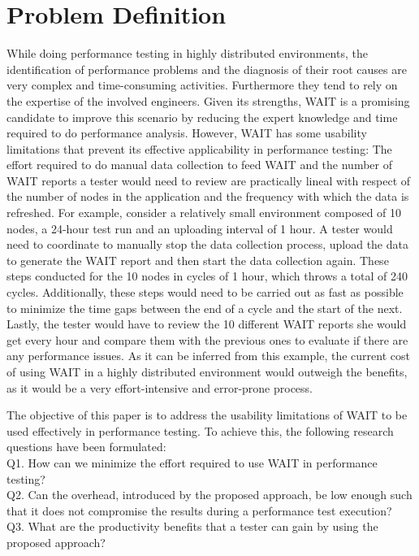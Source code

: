 \documentclass[runningheads,a4paper]{llncs}
\begin{document}
\vspace{-5pt}
\section{Problem Definition}
\vspace{-5pt}
While doing performance testing in highly distributed environments, the
identification of performance problems and the diagnosis of their root causes
are very complex and time-consuming activities. Furthermore they tend to rely
on the expertise of the involved engineers. Given its strengths, WAIT is a
promising candidate to improve this scenario by reducing the expert knowledge and time
required to do performance analysis. However, WAIT has some usability
limitations that prevent its effective applicability in performance testing: The
effort required to do manual data collection to feed WAIT and the number of WAIT
reports a tester would need to review are practically lineal with respect of the
number of nodes in the application and the frequency with which the data is
refreshed. For example, consider a relatively small environment composed of 10
nodes, a 24-hour test run and an uploading interval of 1 hour. A tester would
need to coordinate to manually stop the data collection process, upload the
data to generate the WAIT report and then start the data collection again. These
steps conducted for the 10 nodes in cycles of 1 hour, which throws a total of
240 cycles. Additionally, these steps would need to be carried out as fast as
possible to minimize the time gaps between the end of a cycle and the start of
the next. Lastly, the tester would have to review the 10 different WAIT reports
she would get every hour and compare them with the previous ones to evaluate if
there are any performance issues. As it can be inferred from this example, the current
cost of using WAIT in a highly distributed environment would outweigh the
benefits, as it would be a very effort-intensive and error-prone process.

The objective of this paper is to address the usability limitations of WAIT to
be used effectively in performance testing. To achieve this, the following
research questions have been formulated:
\\Q1. How can we minimize the effort required to use WAIT in performance
testing?
\\Q2. Can the overhead, introduced by the proposed approach, be low enough such that
it does not compromise the results during a performance test execution?
\\Q3. What are the productivity benefits that a tester can gain by using the
proposed approach?
\end{document}
